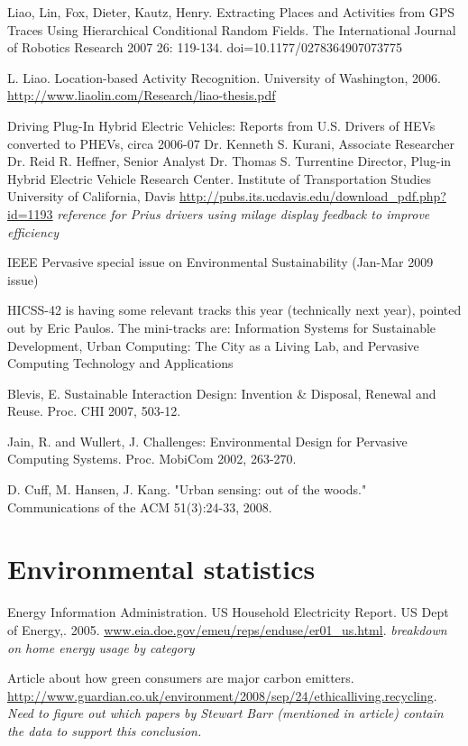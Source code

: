 Liao, Lin, Fox, Dieter, Kautz, Henry. Extracting Places and Activities from GPS Traces Using Hierarchical Conditional Random Fields. The International Journal of Robotics Research 2007 26: 119-134. doi=10.1177/0278364907073775

L. Liao. Location-based Activity Recognition. University of Washington, 2006. \url{http://www.liaolin.com/Research/liao-thesis.pdf}

Driving Plug-In Hybrid Electric Vehicles: Reports from U.S. Drivers of HEVs  
converted to PHEVs, circa 2006-07 Dr. Kenneth S. Kurani, Associate Researcher 
Dr. Reid R. Heffner, Senior Analyst Dr. Thomas S. Turrentine Director, Plug-in Hybrid Electric Vehicle Research Center. Institute of Transportation Studies 
University of California, Davis \url{http://pubs.its.ucdavis.edu/download_pdf.php?id=1193} \emph{reference for Prius drivers using milage display feedback to improve efficiency}

IEEE Pervasive special issue on Environmental Sustainability (Jan-Mar 2009 issue)

HICSS-42 is having some relevant tracks this year (technically next year), pointed out by Eric Paulos. The mini-tracks are: Information Systems for Sustainable Development, Urban Computing: The City as a Living Lab, and Pervasive Computing Technology and Applications

Blevis, E.  Sustainable Interaction Design: Invention \& Disposal, Renewal and Reuse.  Proc. CHI 2007, 503-12.

Jain, R. and Wullert, J. Challenges: Environmental Design for Pervasive Computing Systems.  Proc. MobiCom 2002, 263-270.

D. Cuff, M. Hansen, J. Kang. "Urban sensing: out of the woods." Communications of the ACM 51(3):24-33, 2008.




\section{Environmental statistics}
Energy Information Administration. US Household Electricity Report. US Dept of Energy,. 2005. \url{www.eia.doe.gov/emeu/reps/enduse/er01_us.html}. \emph{breakdown on home energy usage by category}

Article about how green consumers are major carbon emitters. \url{http://www.guardian.co.uk/environment/2008/sep/24/ethicalliving.recycling}. \emph{Need to figure out which papers by Stewart Barr (mentioned in article) contain the data to support this conclusion.}

